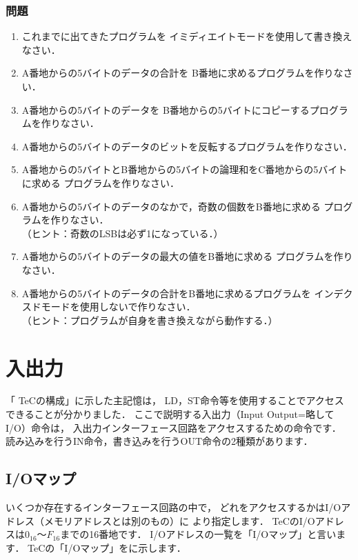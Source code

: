\subsubsection{問題}
\begin{enumerate}
\item これまでに出てきたプログラムを
イミディエイトモードを使用して書き換えなさい．
\item A番地からの5バイトのデータの合計を
B番地に求めるプログラムを作りなさい．
\item A番地からの5バイトのデータを
B番地からの5バイトにコピーするプログラムを作りなさい．
\item A番地からの5バイトのデータのビットを反転するプログラムを作りなさい．
\item A番地からの5バイトとB番地からの5バイトの論理和をC番地からの5バイトに求める
プログラムを作りなさい．
\item A番地からの5バイトのデータのなかで，奇数の個数をB番地に求める
プログラムを作りなさい．\\
（ヒント：奇数のLSBは必ず1になっている．）
\item A番地からの5バイトのデータの最大の値をB番地に求める
プログラムを作りなさい．
\item A番地からの5バイトのデータの合計をB番地に求めるプログラムを
インデクスドモードを使用しないで作りなさい．\\
（ヒント：プログラムが自身を書き換えながら動作する．）
\end{enumerate}

\newpage
\section{入出力}
「 TeCの構成」に示した主記憶は，
LD，ST命令等を使用することでアクセスできることが分かりました．
ここで説明する入出力（Input Output=略して I/O）命令は，
入出力インターフェース回路をアクセスするための命令です．
読み込みを行うIN命令，書き込みを行うOUT命令の2種類があります．

\subsection{I/Oマップ}
\label{iomap}

いくつか存在するインターフェース回路の中で，
どれをアクセスするかはI/Oアドレス（メモリアドレスとは別のもの）に
より指定します．
TeCのI/Oアドレスは$0_{16}$〜$F_{16}$までの16番地です．
I/Oアドレスの一覧を「I/Oマップ」と言います．
TeCの「I/Oマップ」をに示します．

